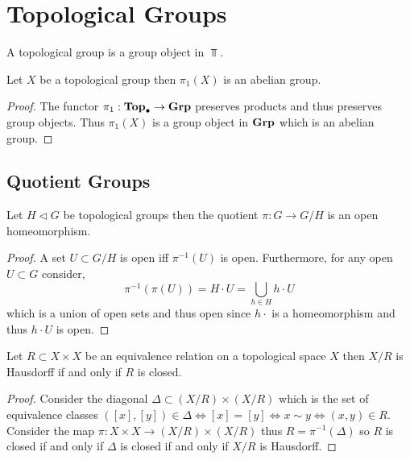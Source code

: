 \documentclass[12pt]{extarticle}
\begin{document}
\section{Topological Groups}

\begin{definition}
A topological group is a group object in $\Top$. 
\end{definition}

\begin{theorem}
Let $X$ be a topological group then $\pi_1(X)$ is an abelian group.
\end{theorem}

\begin{proof}
The functor $\pi_1 : \mathbf{Top}_{\bullet} \to \mathbf{Grp}$ preserves products and thus preserves group objects. Thus $\pi_1(X)$ is a group object in $\mathbf{Grp}$ which is an abelian group. 
\end{proof}

\subsection{Quotient Groups}

\begin{proposition}
Let $H \triangleleft G$ be topological groups then the quotient $\pi : G \to G / H$ is an open homeomorphism.
\end{proposition}

\begin{proof}
A set $U \subset G / H$ is open iff $\pi^{-1}(U)$ is open. Furthermore, for any open $U \subset G$ consider,
\[ \pi^{-1}(\pi(U)) = H \cdot U = \bigcup_{h \in H} h \cdot U \]
which is a union of open sets and thus open since $h \cdot$ is a homeomorphism and thus $h \cdot U$ is open.
\end{proof}

\begin{lemma}
Let $R \subset X \times X$ be an equivalence relation on a topological space $X$ then $X / R$ is Hausdorff if and only if $R$ is closed. 
\end{lemma}

\begin{proof}
Consider the diagonal $\Delta \subset (X / R) \times (X / R)$ which is the set of equivalence classes $([x], [y]) \in \Delta \iff [x] = [y] \iff x \sim y \iff (x, y) \in R$. Consider the map $\pi : X \times X \to (X / R) \times (X / R)$ thus $R = \pi^{-1}(\Delta)$ so $R$ is closed if and only if $\Delta$ is closed if and only if $X/R$ is Hausdorff. 
\end{proof}
\end{document}

